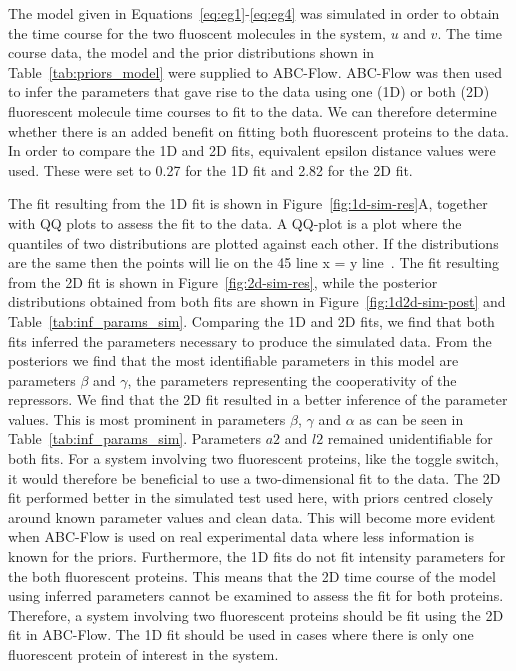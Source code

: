 The model given in Equations~\ref{eq:eg1}-\ref{eq:eg4} was simulated in order to obtain the time course for the two fluoscent molecules in the system, $u$ and $v$. The  time course data, the model and the prior distributions shown in Table~\ref{tab:priors_model} were supplied to ABC-Flow. ABC-Flow was then used to infer the parameters that gave rise to the data using one (1D) or both (2D) fluorescent molecule time courses to fit to the data. We can therefore determine whether there is an added benefit on fitting both fluorescent proteins to the data. In order to compare the 1D and 2D fits, equivalent epsilon distance values were used. These were set to 0.27 for the 1D fit and 2.82 for the 2D fit.

The fit resulting from the 1D fit is shown in Figure~\ref{fig:1d-sim-res}A, together with QQ plots to assess the fit to the data. A QQ-plot is a plot where the quantiles of two distributions are plotted against each other. If the distributions are the same then the points will lie on the 45\textdegree{} line x = y line~\autocite{Wilk:1968ts}. The fit resulting from the 2D fit is shown in Figure~\ref{fig:2d-sim-res}, while the posterior distributions obtained from both fits are shown in Figure~\ref{fig:1d2d-sim-post} and Table~\ref{tab:inf_params_sim}. Comparing the 1D and 2D fits, we find that both fits inferred the parameters necessary to produce the simulated data. From the posteriors we find that the most identifiable parameters in this model are parameters $β$ and $γ$, the parameters representing the cooperativity of the repressors. We find that the 2D fit resulted in a better inference of the parameter values. This is most prominent in parameters $β$, $γ$ and $α$ as can be seen in Table~\ref{tab:inf_params_sim}. Parameters $a2$ and $l2$ remained unidentifiable for both fits. For a system involving two fluorescent proteins, like the toggle switch, it would therefore be beneficial to use a two-dimensional fit to the data. The 2D fit performed better in the simulated test used here, with priors centred closely around known parameter values and clean data. This will become more evident when ABC-Flow is used on real experimental data where less information is known for the priors. Furthermore, the 1D fits do not fit intensity parameters for the both fluorescent proteins. This means that the 2D time course of the model using inferred parameters cannot be examined to assess the fit for both proteins. Therefore, a system involving two fluorescent proteins should be fit using the 2D fit in ABC-Flow. The 1D fit should be used in cases where there is only one fluorescent protein of interest in the system. 

